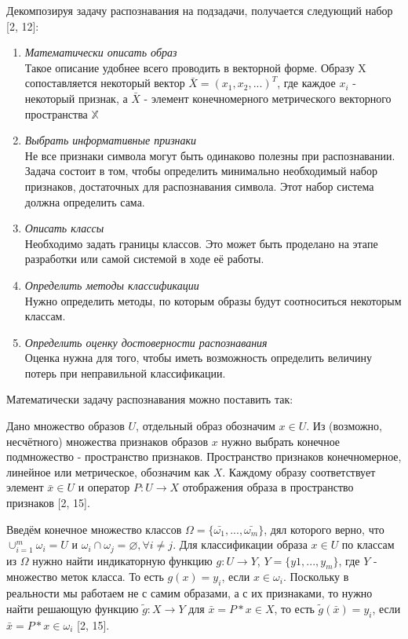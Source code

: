 \documentclass[12pt,a4paper]{article}
\begin{document}
Декомпозируя задачу распознавания на подзадачи, получается следующий набор [2, 12]:
\begin{enumerate}
    \item \textit{Математически описать образ}\\
        Такое описание удобнее всего проводить в векторной форме. Образу X сопоставляется некоторый вектор $\bar{X}=(x_1,x_2,...)^T$, где каждое $x_i$ - некоторый признак, а $\bar{X}$ - элемент конечномерного метрического векторного пространства $\mathbb{X}$
    \item \textit{Выбрать информативные признаки}\\
        Не все признаки символа могут быть одинаково полезны при распознавании. Задача состоит в том, чтобы определить минимально необходимый набор признаков, достаточных для распознавания символа. Этот набор система должна определить сама.
    \item \textit{Описать классы}\\
        Необходимо задать границы классов. Это может быть проделано на этапе разработки или самой системой в ходе её работы.
    \item \textit{Определить методы классификации}\\
        Нужно определить методы, по которым образы будут соотноситься некоторым классам.
    \item \textit{Определить оценку достоверности распознавания}\\
        Оценка нужна для того, чтобы иметь возможность определить величину потерь при неправильной классификации.
\end{enumerate}

Математически задачу распознавания можно поставить так:

Дано множество образов $U$, отдельный образ обозначим $x\in U$. Из (возможно, несчётного) множества признаков образов $x$ нужно выбрать конечное подмножество - пространство признаков. Пространство признаков конечномерное, линейное или метрическое, обозначим как $X$. Каждому образу соответствует элемент $\bar{x} \in U$ и оператор $P: U \longrightarrow X$ отображения образа в пространство признаков [2, 15].

Введём конечное множество классов $\Omega=\{\bar{\omega_1}, ..., \bar{\omega_m}\}$, дял которого верно, что $\cup_{i=1}^m\omega_i = U$ и $\omega_i \cap \omega_j = \varnothing, \forall i \not= j$. Для классификации образа $x \in U$ по классам из $\Omega$ нужно найти индикаторную функцию $g: U \longrightarrow Y$, $Y=\{y1, ..., y_m\}$, где $Y$ - множество меток класса. То есть $g(x)=y_i$, если $x \in \omega_i$. Поскольку в реальности мы работаем не с самим образами, а с их признаками, то нужно найти решающую функцию $\tilde{g}: X \longrightarrow Y$ для $\bar{x}=P*x \in X$, то есть $\tilde{g}(\bar{x})=y_i$, если $\bar{x}=P*x \in \omega_i$ [2, 15].
\end{document}

